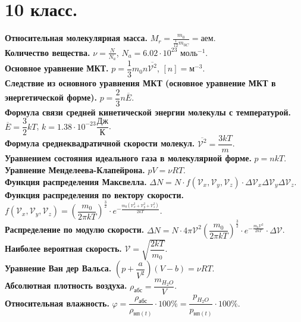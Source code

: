 \documentclass[12pt]{article}
\begin{document}
	\section{10 класс.}
	\textbf{Относительная молекулярная масса.} $M_r = \frac{m_0}{\frac{1}{12} m_{0C}} = \text{аем}$. \\
	\textbf{Количество вещества.} $\nu = \frac{N}{N_a}$, $N_a = 6.02 \cdot 10^{23} \text{ моль}^{-1}$. \\
	\textbf{Основное уравнение МКТ.} $p = \dfrac{1}{3} m_0 n \overline{\mathcal{V}^2}$, $[n] = \text{м}^{-3}$. \\
	\textbf{Следствие из основного уравнения МКТ (основное уравнение МКТ в энергетической форме).} $p = \dfrac{2}{3} n \overline{E}$. \\
	\textbf{Формула связи средней кинетической энергии молекулы с температурой.} $\overline{E} = \dfrac{3}{2}kT$, $k = 1.38 \cdot 10^{-23} \dfrac{\text{Дж}}{\text{К}}$. \\
	\textbf{Формула среднеквадратичной скорости молекул.} $\overline{\mathcal{V}^2} = \dfrac{3kT}{m}$. \\
	\textbf{Уравнением состояния идеального газа в молекулярной форме.} $p = nkT$. \\
	\textbf{Уравнение Менделеева-Клапейрона.} $pV = \nu RT$. \\
	\textbf{Функция распределения Максвелла.} $\varDelta N = N \cdot f(\mathcal{V}_x, \mathcal{V}_y, \mathcal{V}_z) \cdot \varDelta \mathcal{V}_x \varDelta \mathcal{V}_y \varDelta \mathcal{V}_z$. \\
	\textbf{Функция распределения по вектору скорости.} $f(\mathcal{V}_x, \mathcal{V}_y, \mathcal{V}_z) = \left( \dfrac{m_0}{2 \pi kT} \right)^{\frac{3}{2}} \cdot e^{- \frac{m_0(\mathcal{V}_x^2 + \mathcal{V}_y^2 + \mathcal{V}_z^2)}{2kT}}$. \\
	\textbf{Распределение по модулю скорости.} $\varDelta N = N \cdot 4 \pi \mathcal{V}^2 \left( \dfrac{m_0}{2 \pi kT} \right)^{\frac{3}{2}} \cdot e^{- \frac{m_0\mathcal{V}^2}{2kT}} \cdot \varDelta \mathcal{V}$. \\
	\textbf{Наиболее вероятная скорость.} $\mathcal{V} = \sqrt{\dfrac{2kT}{m_0}}$. \\
	\textbf{Уравнение Ван дер Вальса.} $(p + \dfrac{a}{V^2})(V - b) = \nu RT$. \\
	\textbf{Абсолютная плотность воздуха.} $\rho_{\text{абс}} = \dfrac{m_{H_2O}}{V}$. \\
	\textbf{Относительная влажность.} $\varphi = \dfrac{\rho_{\text{абс}}}{\rho_{\text{нп}(t)}} \cdot 100 \% = \dfrac{p_{H_2O}}{p_{\text{нп}(t)}} \cdot 100 \%$.
\end{document}
